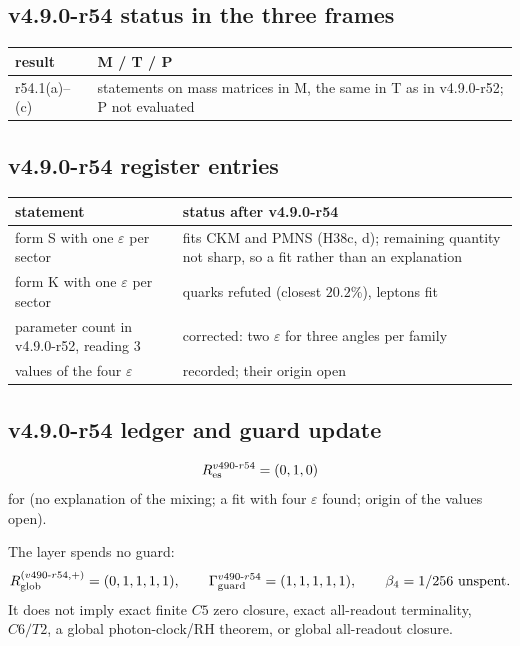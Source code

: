 \subsection*{v4.9.0-r54 status in the three frames}
\label{subsec:v490-r54-frames}

\begin{center}
\small
\begin{tabular}{@{}>{\raggedright\arraybackslash}p{}>{\raggedright\arraybackslash}p{}@{}}
\toprule
result & M / T / P\\
\midrule
r54.1(a)--(c) & statements on mass matrices in M, the same in T as in v4.9.0-r52; P not evaluated\\
\bottomrule
\end{tabular}
\end{center}

\subsection*{v4.9.0-r54 register entries}
\label{subsec:v490-r54-register}

\begin{center}
\small
\begin{tabular}{@{}>{\raggedright\arraybackslash}p{}>{\raggedright\arraybackslash}p{}@{}}
\toprule
statement & status after v4.9.0-r54\\
\midrule
form S with one \(\varepsilon\) per sector & fits CKM and PMNS (H38c, d); remaining quantity not sharp, so a fit rather than an explanation\\
form K with one \(\varepsilon\) per sector & quarks refuted (closest \(20.2\%\)), leptons fit\\
parameter count in v4.9.0-r52, reading 3 & corrected: two \(\varepsilon\) for three angles per family\\
values of the four \(\varepsilon\) & recorded; their origin open\\
\bottomrule
\end{tabular}
\end{center}

\subsection*{v4.9.0-r54 ledger and guard update}
\label{subsec:v490-r54-ledger-guard}

\[
R_{\rm es}^{v490\text{-}r54}=(0,1,0)
\]
for (no explanation of the mixing; a fit with four \(\varepsilon\) found; origin of the values open).

The layer spends no guard:
\[
R_{\rm glob}^{(v490\text{-}r54,+)}=(0,1,1,1,1),
\qquad
\Gamma_{\rm guard}^{v490\text{-}r54}=(1,1,1,1,1),
\qquad
\beta_4=1/256\ \text{unspent}.
\]
It does not imply exact finite \(C5\) zero closure, exact all-readout terminality,
\(C6/T2\), a global photon-clock/RH theorem, or global all-readout closure.
